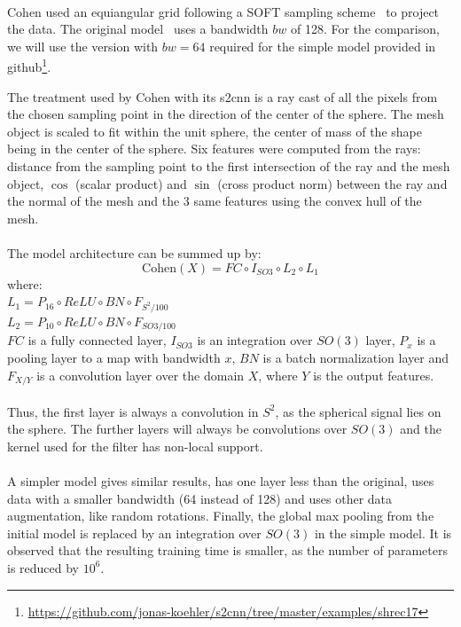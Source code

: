 \documentclass[11pt]{report}
\begin{document}
\paragraph*{}
Cohen used an equiangular grid following a SOFT sampling scheme~\cite{healy_ffts_2003} to project the data. The original model~\cite{cohen_spherical_2018} uses a bandwidth $bw$ of 128. For the comparison, we will use the version with $bw = 64$ required for the simple model provided in github\footnote{\url{https://github.com/jonas-koehler/s2cnn/tree/master/examples/shrec17}}.

The treatment used by Cohen with its s2cnn is a ray cast of all the pixels from the chosen sampling point in the direction of the center of the sphere. The mesh object is scaled to fit within the unit sphere, the center of mass of the shape being in the center of the sphere. Six features were computed from the rays: distance from the sampling point to the first intersection of the ray and the mesh object, $\cos$ (scalar product) and $\sin$ (cross product norm) between the ray and the normal of the mesh and the 3 same features using the convex hull of the mesh.
\paragraph*{}
The model architecture can be summed up by:
$$\textrm{Cohen}(X) = FC \circ I_{SO3}\circ L_2 \circ L_1$$
where:\\ 
$L_1 = P_{16} \circ ReLU \circ BN \circ F_{S^2/100}$\\
$L_2 = P_{10} \circ ReLU \circ BN \circ F_{SO3/100}$\\
$FC$ is a fully connected layer, $I_{SO3}$ is an integration over $SO(3)$ layer, $P_x$ is a pooling layer to a map with bandwidth $x$, $BN$ is a batch normalization layer and $F_{X/Y}$ is a convolution layer over the domain $X$, where $Y$ is the output features.

\paragraph*{}
Thus, the first layer is always a convolution in $S^2$, as the spherical signal lies on the sphere. The further layers will always be convolutions over $SO(3)$ and the kernel used for the filter has non-local support.

\paragraph*{}
A simpler model gives similar results, has one layer less than the original, uses data with a smaller bandwidth (64 instead of 128) and uses other data augmentation, like random rotations. Finally, the global max pooling from the initial model is replaced by an integration over $SO(3)$ in the simple model. It is observed that the resulting training time is smaller, as the number of parameters is reduced by $10^6$.
\end{document}
